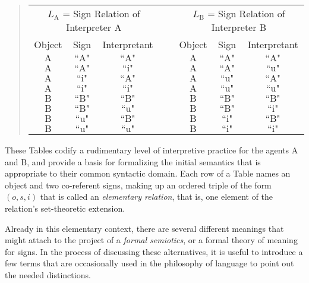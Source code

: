 \documentclass[12pt]{article}
\begin{document}
\begin{quote}\begin{tabular}{|c|c|c|p{2cm}|c|c|c|}
\multicolumn{3}{c}{$L_{\mathrm{A}}$ = Sign Relation of Interpreter A} &
\multicolumn{1}{c}{~} &
\multicolumn{3}{c}{$L_{\mathrm{B}}$ = Sign Relation of Interpreter B} \\
\cline{1-3}\cline{5-7}
Object & Sign & Interpretant & & Object & Sign & Interpretant \\
\cline{1-3}\cline{5-7}
$\mathrm{A}$ & $\text{``A"}$ & $\text{``A"}$ &&
$\mathrm{A}$ & $\text{``A"}$ & $\text{``A"}$ \\
\cline{1-3}\cline{5-7}
$\mathrm{A}$ & $\text{``A"}$ & $\text{``i"}$ &&
$\mathrm{A}$ & $\text{``A"}$ & $\text{``u"}$ \\
\cline{1-3}\cline{5-7}
$\mathrm{A}$ & $\text{``i"}$ & $\text{``A"}$ &&
$\mathrm{A}$ & $\text{``u"}$ & $\text{``A"}$ \\
\cline{1-3}\cline{5-7}
$\mathrm{A}$ & $\text{``i"}$ & $\text{``i"}$ &&
$\mathrm{A}$ & $\text{``u"}$ & $\text{``u"}$ \\
\cline{1-3}\cline{5-7}
$\mathrm{B}$ & $\text{``B"}$ & $\text{``B"}$ &&
$\mathrm{B}$ & $\text{``B"}$ & $\text{``B"}$ \\
\cline{1-3}\cline{5-7}
$\mathrm{B}$ & $\text{``B"}$ & $\text{``u"}$ &&
$\mathrm{B}$ & $\text{``B"}$ & $\text{``i"}$ \\
\cline{1-3}\cline{5-7}
$\mathrm{B}$ & $\text{``u"}$ & $\text{``B"}$ &&
$\mathrm{B}$ & $\text{``i"}$ & $\text{``B"}$ \\
\cline{1-3}\cline{5-7}
$\mathrm{B}$ & $\text{``u"}$ & $\text{``u"}$ &&
$\mathrm{B}$ & $\text{``i"}$ & $\text{``i"}$ \\
\cline{1-3}\cline{5-7}
\end{tabular}\end{quote}

These Tables codify a rudimentary level of interpretive practice for the agents $\mathrm{A}$ and $\mathrm{B}$, and provide a basis for formalizing the initial semantics that is appropriate to their common syntactic domain.  Each row of a Table names an object and two co-referent signs, making up an ordered triple of the form $(o, s, i)$ that is called an \textit{elementary relation}, that is, one element of the relation's set-theoretic extension.

Already in this elementary context, there are several different meanings that might attach to the project of a \textit{formal semiotics}, or a formal theory of meaning for signs.  In the process of discussing these alternatives, it is useful to introduce a few terms that are occasionally used in the philosophy of language to point out the needed distinctions.
\end{document}
